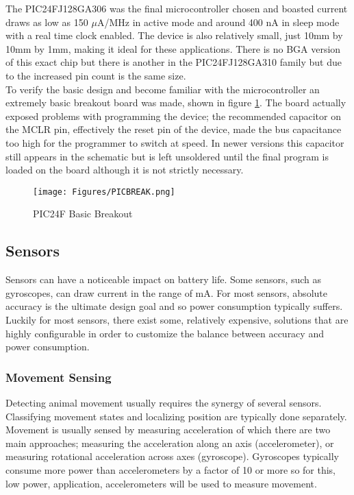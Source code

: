 \documentclass[12pt,openany,a4paper]{book}
\begin{document}
		The PIC24FJ128GA306 was the final microcontroller chosen \cite{PIC24} and boasted current draws as low as 150 $\mu$A/MHz in active mode and around 400 nA in sleep mode with a real time clock enabled. The device is also relatively small, just 10mm by 10mm by 1mm, making it ideal for these applications. There is no BGA version of this exact chip but there is another in the PIC24FJ128GA310 family but due to the increased pin count is the same size. \\
		
		To verify the basic design and become familiar with the microcontroller an extremely basic breakout board was made, shown in figure \ref{fig:PICBREAK}. The board actually exposed problems with programming the device; the recommended capacitor on the MCLR pin, effectively the reset pin of the device, made the bus capacitance too high for the programmer to switch at speed. In newer versions this capacitor still appears in the schematic but is left unsoldered until the final program is loaded on the board although it is not strictly necessary. \\
		
		\begin{figure}[H]
			\centering
			\texttt{[image: Figures/PICBREAK.png]}
			\caption{PIC24F Basic Breakout}
			\label{fig:PICBREAK}
		\end{figure}		
		
		\newpage
		\subsection{Sensors}
		Sensors can have a noticeable impact on battery life. Some sensors, such as gyroscopes, can draw current in the range of mA. For most sensors, absolute accuracy is the ultimate design goal and so power consumption typically suffers. Luckily for most sensors, there exist some, relatively expensive, solutions that are highly configurable in order to customize the balance between accuracy and power consumption. \\
		
			\subsubsection{Movement Sensing}		
			Detecting animal movement usually requires the synergy of several sensors. Classifying movement states and localizing position are typically done separately. Movement is usually sensed by measuring acceleration of which there are two main approaches; measuring the acceleration along an axis (accelerometer), or measuring rotational acceleration across axes (gyroscope). Gyroscopes typically consume more power than accelerometers by a factor of 10 or more \cite{InvenMPU9150} so for this, low power, application, accelerometers will be used to measure movement. \\
						
\end{document}
